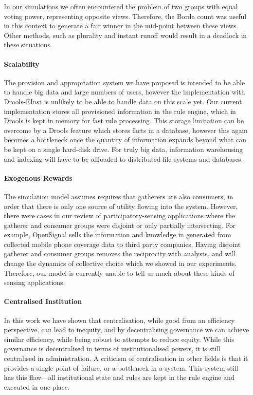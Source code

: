 In our simulations we often encountered the problem of two groups with equal
voting power, representing opposite views. Therefore, the Borda count was
useful in this context to generate a fair winner in the mid-point between
these views. Other methods, such as plurality and instant runoff would result
in a deadlock in these situations.

\paragraph{Scalability} The provision and appropriation system we have
proposed is intended to be able to handle big data and large numbers of users,
however the implementation with Drools-EInst is unlikely to be able to handle
data on this scale yet. Our current implementation stores all provisioned
information in the rule engine, which in Drools is kept in memory for fast
rule processing. This storage limitation can be overcome by a Drools feature
which stores facts in a database, however this again becomes a bottleneck once
the quantity of information expands beyond what can be kept on a single hard-disk
drive. For truly big data, information warehousing and indexing will have
to be offloaded to distributed file-systems and databases.

\paragraph{Exogenous Rewards} The simulation model assumes requires that
gatherers are also consumers, in order that there is only one source of
utility flowing into the system. However, there were cases in our review of
participatory-sensing applications where the gatherer and consumer groups were
disjoint or only partially intersecting. For example, OpenSignal sells the
information and knowledge in generated from collected mobile phone coverage
data to third party companies. Having disjoint gatherer and consumer groups
removes the reciprocity with analysts, and will change the dynamics of
collective choice which we showed in our experiments. Therefore, our model is
currently unable to tell us much about these kinds of sensing applications.

\paragraph{Centralised Institution} In this work we have shown that
centralisation, while good from an efficiency perspective, can lead to
inequity, and by decentralising governance we can achieve similar efficiency,
while being robust to attempts to reduce equity. While this governance is
decentralised in terms of institutionalised powers, it is still centralised in
administration. A criticism of centralisation in other fields is that it
provides a single point of failure, or a bottleneck in a system. This system
still has this flaw---all institutional state and rules are kept in the rule
engine and executed in one place.

